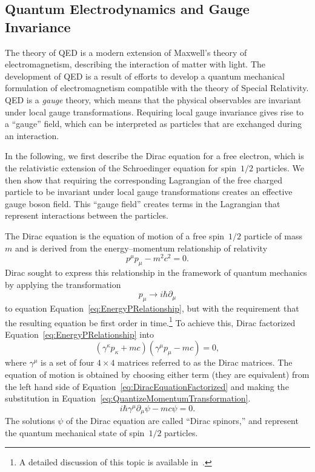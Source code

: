 \subsection{Quantum Electrodynamics and Gauge Invariance}
\label{sec:QEDandGaugeInvariance}

The theory of QED is a modern extension of Maxwell's theory of
electromagnetism, describing the interaction of matter with light.  The
development of QED is a result of efforts to develop a quantum mechanical
formulation of electromagnetism compatible with the theory of Special Relativity.
QED is a \emph{gauge} theory, which means that the physical observables are
invariant under local gauge transformations.  Requiring local gauge
invariance gives rise to a ``gauge'' field, which can be interpreted as 
particles that are exchanged during an interaction.  

In the following, we first describe the Dirac equation for a free electron,
which is the relativistic extension of the Schroedinger equation for spin~$1/2$
particles.  We then show that requiring the corresponding Lagrangian of the free
charged particle to be invariant under local gauge transformations creates an
effective gauge boson field.  This ``gauge field'' creates terms in the
Lagrangian that represent interactions between the particles.

The Dirac equation is the equation of motion of a free spin~$1/2$ particle of
mass~$m$ and is derived from the energy--momentum relationship of relativity
\begin{equation}
  p^{\mu}p_\mu - m^2c^2 = 0.
  \label{eq:EnergyPRelationship}
\end{equation}
Dirac sought to express this relationship in the framework of quantum mechanics
by applying the transformation
\begin{equation}
  p_\mu \to i \hbar \partial_\mu 
  \label{eq:QuantizeMomentumTransformation}
\end{equation}
to equation Equation~\ref{eq:EnergyPRelationship}, but with the requirement that
the resulting equation be first order in time.\footnote{A detailed
discussion of this topic is available in~\cite{Griffiths:IntroParticle}.}
To achieve this, Dirac factorized Equation~\ref{eq:EnergyPRelationship} into 
\begin{equation}
  (\gamma^\kappa p_\kappa + mc)(\gamma^\mu p_\mu - mc) = 0,
  \label{eq:DiracEquationFactorized}
\end{equation}
where $\gamma^\mu$ is a set of four $4\times4$ matrices referred to as the Dirac
matrices.  The equation of motion is obtained by choosing either term (they are
equivalent) from the
left hand side of Equation~\ref{eq:DiracEquationFactorized} and
making the substitution in Equation~\ref{eq:QuantizeMomentumTransformation}.
\begin{equation}
  i \hbar \gamma^\mu \partial_\mu \psi - mc \psi = 0.
  \label{eq:DiracEquation}
\end{equation}
The solutions $\psi$ of the Dirac equation are called ``Dirac spinors,'' and
represent the quantum mechanical state of spin~$1/2$ particles.

